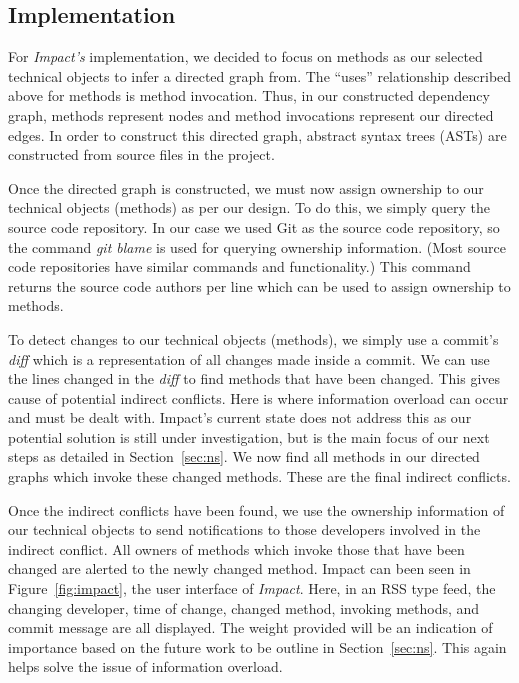 \documentclass[conference]{IEEEtran}
\begin{document}
\subsection{Implementation}
For \textit{Impact's} implementation, we decided to focus on methods as our
selected technical objects to infer a directed graph from. The ``uses'' 
relationship described above for methods is method invocation.
Thus, in our constructed dependency graph, methods represent nodes
and method invocations represent our directed edges. In order to 
construct this directed graph, abstract syntax trees (ASTs) are 
constructed from source files in the project.

Once the directed graph is constructed, we must now assign
ownership to our technical objects (methods) as per our design.
To do this, we simply query the source code repository. In our case
we used Git as the source code repository, so the command \textit{git blame}
is used for querying ownership information. (Most source code 
repositories have similar commands and functionality.) This command 
returns the source code authors per line which can be used to assign
ownership to methods.

To detect changes to our technical objects (methods), we simply 
use a commit's \textit{diff} which is a representation of all changes
made inside a commit. We can use the lines changed in the \textit{diff} to 
find methods that have been changed. This gives cause of potential
indirect conflicts. Here is where information overload can occur and must
be dealt with. Impact's current state does not address this as our potential 
solution is still under investigation, but is the
main focus of our next steps as detailed in Section~\ref{sec:ns}.
We now find all methods in our directed graphs which invoke these changed methods. 
These are the final indirect conflicts.

Once the indirect conflicts have been found, we use the
ownership information of our technical objects to send notifications to
those developers involved in the indirect conflict. All owners
of methods which invoke those that have been changed are alerted
to the newly changed method. Impact can been seen in
Figure~\ref{fig:impact}, the user interface of \textit{Impact}. Here, in an RSS type
feed, the changing developer, time of change, changed method,
invoking methods, and commit message are all displayed. 
The weight provided will be an indication of importance based
on the future work to be outline in Section~\ref{sec:ns}. This
again helps solve the issue of information overload.
\end{document}
